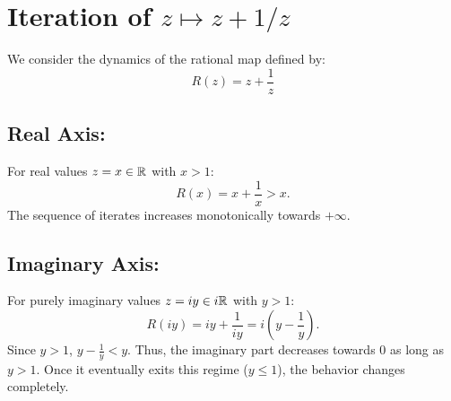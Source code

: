 \section{Iteration of $z \mapsto z + 1/z$}
\label{sec:iteration_of_z_plus_one_over_z}

We consider the dynamics of the rational map defined by:
\begin{equation*} R(z) = z + \frac{1}{z} \end{equation*}

\subsection*{Real Axis:}
For real values $z = x \in \mathbb{R}$ with $x > 1$:
\begin{equation*}
    R(x) = x + \frac{1}{x} > x.
\end{equation*}
The sequence of iterates increases monotonically towards $+\infty$.

\begin{center}
\end{center}

\vspace{1em}

\subsection*{Imaginary Axis:}
For purely imaginary values $z = iy \in i\mathbb{R}$ with $y > 1$:
\begin{equation*}
    R(iy) = iy + \frac{1}{iy} = i\left(y - \frac{1}{y}\right).
\end{equation*}
Since $y > 1$, $y - \frac{1}{y} < y$. Thus, the imaginary part decreases towards
$0$ as long as $y > 1$. Once it eventually exits this regime ($y \leq 1$), the
behavior changes completely.

\begin{center}
\end{center}

